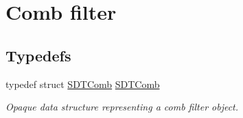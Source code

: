 \hypertarget{group__comb}{}\section{Comb filter}
\label{group__comb}
\subsection*{Typedefs}
\begin{DoxyCompactItemize}
\item 
\hypertarget{group__comb_ga6d48ca6dc0e03cd39bc44193e4d208db}{}typedef struct \hyperlink{group__comb_ga6d48ca6dc0e03cd39bc44193e4d208db}{S\+D\+T\+Comb} \hyperlink{group__comb_ga6d48ca6dc0e03cd39bc44193e4d208db}{S\+D\+T\+Comb}\label{group__comb_ga6d48ca6dc0e03cd39bc44193e4d208db}

\begin{DoxyCompactList}\small\item\em Opaque data structure representing a comb filter object. \end{DoxyCompactList}\end{DoxyCompactItemize}
